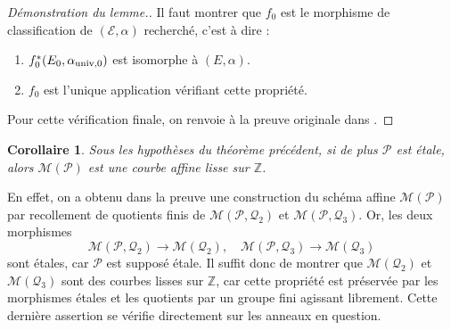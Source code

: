 \documentclass[11pt,a4paper]{article}
\newcommand{\Z}{\mathbb{Z}}
\newcommand{\E}{\mathcal{E}}
\renewcommand{\Pr}{\mathcal{P}}
\newcommand{\Qr}{\mathcal{Q}}
\newcommand{\M}{\mathcal{M}}
\newcommand{\vers}{\longrightarrow}
\newtheorem*{cor}{Corollaire}
\theoremstyle{definition}
\begin{document}
\begin{proof}[Démonstration du lemme.]
Il faut montrer que $f_0$ est le morphisme de classification de $(\E, \alpha)$ recherché, c'est  à dire :
\begin{enumerate}
\item $f_0^*(E_0, \alpha_{\mathrm{univ}, 0})$ est isomorphe à $(E, \alpha)$.
\item $f_0$ est l'unique application vérifiant cette propriété.
\end{enumerate}
Pour cette vérification finale, on renvoie à la preuve originale dans \cite{KaMa}.
%
\end{proof}

\begin{cor}
Sous les hypothèses du théorème précédent, si de plus $\Pr$ est étale, alors $\M(\Pr)$ est une courbe affine lisse sur $\Z$.
\end{cor}
En effet, on a obtenu dans la preuve une construction du schéma affine $\M(\Pr)$ par recollement de quotients finis de $\M(\Pr, \Qr_2)$ et $\M(\Pr, \Qr_3)$. Or, les deux morphismes
$$\M(\Pr, \Qr_2)\vers \M(\Qr_2),\quad \M(\Pr, \Qr_3)\vers \M(\Qr_3)$$
sont étales, car $\Pr$ est supposé étale. Il suffit donc de montrer que $\M(\Qr_2)$ et $\M(\Qr_3)$ sont des courbes lisses sur $\Z$, car cette propriété est préservée par les morphismes étales et les quotients par un groupe fini agissant librement. Cette dernière assertion se vérifie directement sur les anneaux en question.
\end{document}
